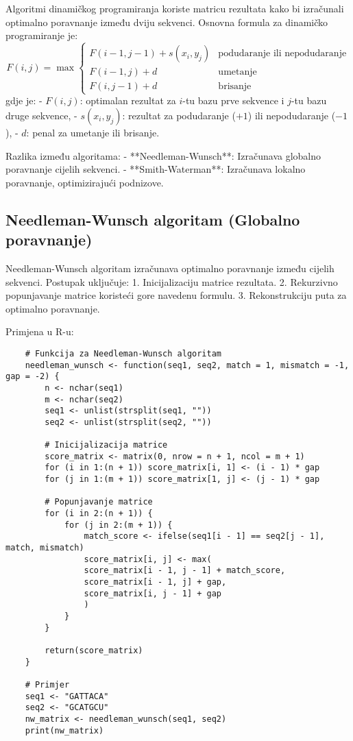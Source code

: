 \documentclass[10pt,a4paper,twoside]{article}
\begin{document}
Algoritmi dinamičkog programiranja koriste matricu rezultata kako bi izračunali optimalno poravnanje između dviju sekvenci. Osnovna formula za dinamičko programiranje je:
\[
F(i, j) = \max 
\begin{cases} 
	F(i-1, j-1) + s(x_i, y_j) & \text{podudaranje ili nepodudaranje} \\
	F(i-1, j) + d & \text{umetanje} \\
	F(i, j-1) + d & \text{brisanje}
\end{cases}
\]
gdje je:
- \( F(i, j) \): optimalan rezultat za \( i \)-tu bazu prve sekvence i \( j \)-tu bazu druge sekvence,
- \( s(x_i, y_j) \): rezultat za podudaranje (\(+1\)) ili nepodudaranje (\(-1\)),
- \( d \): penal za umetanje ili brisanje.

Razlika između algoritama:
- **Needleman-Wunsch**: Izračunava globalno poravnanje cijelih sekvenci.
- **Smith-Waterman**: Izračunava lokalno poravnanje, optimizirajući podnizove.

\subsection*{Needleman-Wunsch algoritam (Globalno poravnanje)}

Needleman-Wunsch algoritam izračunava optimalno poravnanje između cijelih sekvenci. Postupak uključuje:
1. Inicijalizaciju matrice rezultata.
2. Rekurzivno popunjavanje matrice koristeći gore navedenu formulu.
3. Rekonstrukciju puta za optimalno poravnanje.

Primjena u R-u:
\begin{verbatim}
	# Funkcija za Needleman-Wunsch algoritam
	needleman_wunsch <- function(seq1, seq2, match = 1, mismatch = -1, gap = -2) {
		n <- nchar(seq1)
		m <- nchar(seq2)
		seq1 <- unlist(strsplit(seq1, ""))
		seq2 <- unlist(strsplit(seq2, ""))
		
		# Inicijalizacija matrice
		score_matrix <- matrix(0, nrow = n + 1, ncol = m + 1)
		for (i in 1:(n + 1)) score_matrix[i, 1] <- (i - 1) * gap
		for (j in 1:(m + 1)) score_matrix[1, j] <- (j - 1) * gap
		
		# Popunjavanje matrice
		for (i in 2:(n + 1)) {
			for (j in 2:(m + 1)) {
				match_score <- ifelse(seq1[i - 1] == seq2[j - 1], match, mismatch)
				score_matrix[i, j] <- max(
				score_matrix[i - 1, j - 1] + match_score,
				score_matrix[i - 1, j] + gap,
				score_matrix[i, j - 1] + gap
				)
			}
		}
		
		return(score_matrix)
	}
	
	# Primjer
	seq1 <- "GATTACA"
	seq2 <- "GCATGCU"
	nw_matrix <- needleman_wunsch(seq1, seq2)
	print(nw_matrix)
\end{verbatim}
\end{document}
